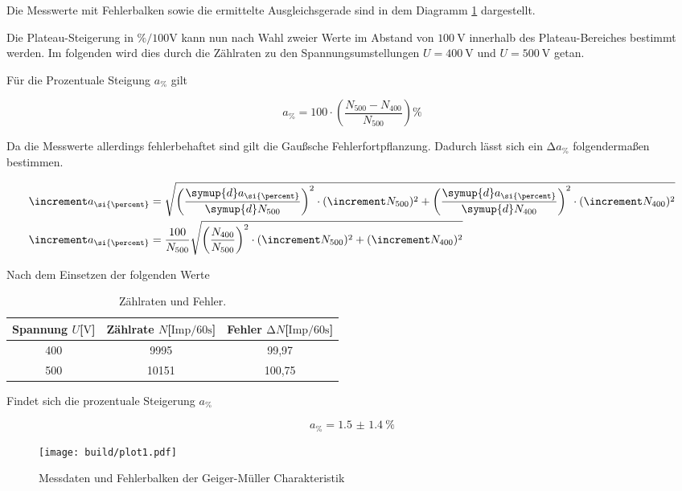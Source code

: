 \begin{flushleft}
Die Messwerte mit Fehlerbalken sowie die ermittelte Ausgleichsgerade sind in dem Diagramm
\ref{fig:plot1} dargestellt.

Die Plateau-Steigerung in $\si{\percent\per{100}\volt}$ kann nun nach Wahl zweier Werte im Abstand von $\SI{100}{\volt}$ innerhalb
des Plateau-Bereiches bestimmt werden. Im folgenden wird dies durch die Zählraten zu den Spannungsumstellungen $U = \SI{400}{\volt}$ und
$U = \SI{500}{\volt}$ getan.

Für die Prozentuale Steigung $a_{\si{\percent}}$ gilt 

\begin{equation}
a_{\si{\percent}} = 100 \cdot\left( \frac{N_{500} - N_{400} }{N_{500}} \right) \si{\percent}
\end{equation}

Da die Messwerte allerdings fehlerbehaftet sind gilt die Gaußsche Fehlerfortpflanzung. Dadurch lässt sich
ein $\increment a_{\si{\percent}}$ folgendermaßen bestimmen.

\begin{align}
\increment a_{\si{\percent}} &= \sqrt{\left(\frac{\symup{d}a_{\si{\percent}}}{\symup{d}N_{500}}\right)^{2} \cdot 
(\increment N_{500})^{2} + \left(\frac{\symup{d}a_{\si{\percent}}}{\symup{d}N_{400}}\right)^{2} \cdot
(\increment N_{400})^{2}} \\
\increment a_{\si{\percent}} &= \frac{100}{N_{500}}\sqrt{\left(\frac{N_{400}}{N_{500}}\right)^{2} \cdot 
(\increment N_{500})^{2} +
(\increment N_{400})^{2}}
\end{align}

Nach dem Einsetzen der folgenden Werte

\begin{table}
\centering
\caption{Zählraten und Fehler.}
\label{tab:ogemessdaten2}
\begin{tabular}{c c c}
    \toprule
    Spannung $U$[$\si{\volt}$] & Zählrate $N$[$\text{Imp}\si{\per{60}\second}$] & Fehler $\increment N$[$\text{Imp}\si{\per{60}\second}$]\\
    \midrule
    400   & 9995 & 99{,}97\\
    500	  & 10151 & 100{,}75\\
    \bottomrule
\end{tabular}
\end{table}

Findet sich die prozentuale Steigerung $a_{\si{\percent}}$

\begin{equation}
a_{\si{\percent}} = \SI{1.5(14)}{\percent}
\end{equation}

\end{flushleft}
\begin{figure}[h]
  \centering
  \texttt{[image: build/plot1.pdf]}
  \caption{Messdaten und Fehlerbalken der Geiger-Müller Charakteristik}
  \label{fig:plot1}
\end{figure}

